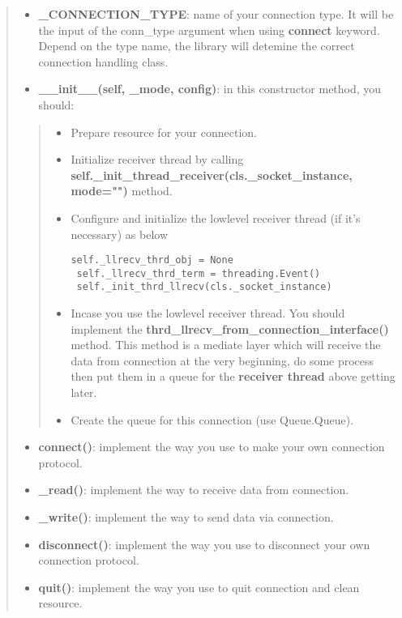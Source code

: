 \begin{quote}
\begin{itemize}
\tightlist
\item
  \textbf{\_CONNECTION\_TYPE}: name of your connection type. It will be
  the input of the conn\_type argument when using \textbf{connect}
  keyword. Depend on the type name, the library will detemine the
  correct connection handling class.
\item
  \textbf{\_\_init\_\_(self, \_mode, config)}: in this constructor
  method, you should:
\end{itemize}

\begin{quote}
\begin{itemize}
\item
  Prepare resource for your connection.
\item
  Initialize receiver thread by calling
  \textbf{self.\_init\_thread\_receiver(cls.\_socket\_instance,
  mode="")} method.
\item
  Configure and initialize the lowlevel receiver thread (if it's
  necessary) as below

\begin{verbatim}
self._llrecv_thrd_obj = None
 self._llrecv_thrd_term = threading.Event()
 self._init_thrd_llrecv(cls._socket_instance)
\end{verbatim}
\item
  Incase you use the lowlevel receiver thread. You should implement the
  \textbf{thrd\_llrecv\_from\_connection\_interface()} method. This
  method is a mediate layer which will receive the data from connection
  at the very beginning, do some process then put them in a queue for
  the \textbf{receiver thread} above getting later.
\item
  Create the queue for this connection (use Queue.Queue).
\end{itemize}
\end{quote}

\begin{itemize}
\tightlist
\item
  \textbf{connect()}: implement the way you use to make your own
  connection protocol.
\item
  \textbf{\_read()}: implement the way to receive data from connection.
\item
  \textbf{\_write()}: implement the way to send data via connection.
\item
  \textbf{disconnect()}: implement the way you use to disconnect your
  own connection protocol.
\item
  \textbf{quit()}: implement the way you use to quit connection and
  clean resource.
\end{itemize}
\end{quote}

